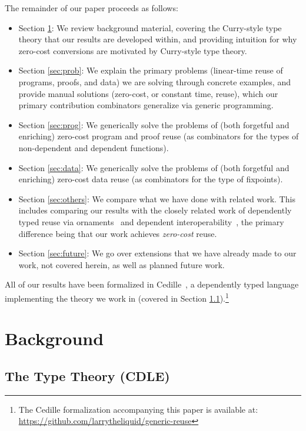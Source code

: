 \documentclass[acmsmall]{acmart}\settopmatter{}
\newcommand{\refsec}[1]{Section \ref{sec:#1}}
\newcommand{\labsec}[1]{\label{sec:#1}}
\begin{document}
The remainder of our paper proceeds as follows:
\begin{itemize}
\item{\refsec{back}:} We review background material, covering the
  Curry-style type theory that our results are developed within, and
  providing intuition for why zero-cost conversions are motivated by
  Curry-style type theory.
\item{\refsec{prob}:} We explain the primary problems
  (linear-time reuse of programs, proofs, and data) we are solving
  through concrete examples, and provide manual solutions (zero-cost,
  or constant time, reuse), which our
  primary contribution combinators generalize via generic programming.
\item{\refsec{prog}:} We generically solve the problems of
  (both forgetful and enriching) zero-cost
  program and proof reuse (as combinators for the types of non-dependent
  and dependent functions).
\item{\refsec{data}:} We generically solve the problems of
  (both forgetful and enriching) zero-cost
  data reuse (as combinators for the type of fixpoints).
\item{\refsec{others}: We compare what we have done with related
  work. This includes comparing our results with the closely related
  work of dependently typed reuse via
  ornaments~\cite{ornaments:original} and
  dependent interoperability~\cite{dagand:interop}, the primary
  difference being that our work achieves \textit{zero-cost} reuse.}
\item{\refsec{future}: We go over extensions that we have already made
  to our work, not covered herein, as well as planned future work.}
\end{itemize}
All of our results have been formalized in
Cedille~\cite{stump17a,stump18}, a dependently typed language
implementing the theory we work in
(covered in \refsec{back:cdle}).\footnote{
  \raggedright{The Cedille formalization accompanying this paper is available at:\\
  \url{https://github.com/larrytheliquid/generic-reuse}}
}

\section{Background}
\labsec{back}

\subsection{The Type Theory (CDLE)}
\labsec{back:cdle}
\end{document}
